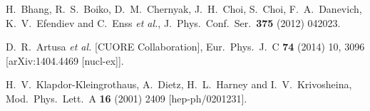 \documentclass{PoS}
\begin{document}
\begin{thebibliography}{99}
  H.~Bhang, R.~S.~Boiko, D.~M.~Chernyak, J.~H.~Choi, S.~Choi, F.~A.~Danevich, K.~V.~Efendiev and C.~Enss {\it et al.},
  J.\ Phys.\ Conf.\ Ser.\  {\bf 375} (2012) 042023.

  D.~R.~Artusa {\it et al.}  [CUORE Collaboration],
  Eur.\ Phys.\ J.\ C {\bf 74} (2014) 10,  3096
  [arXiv:1404.4469 [nucl-ex]].

  H.~V.~Klapdor-Kleingrothaus, A.~Dietz, H.~L.~Harney and I.~V.~Krivosheina,
  Mod.\ Phys.\ Lett.\ A {\bf 16} (2001) 2409
  [hep-ph/0201231].


\end{thebibliography}
\end{document}
